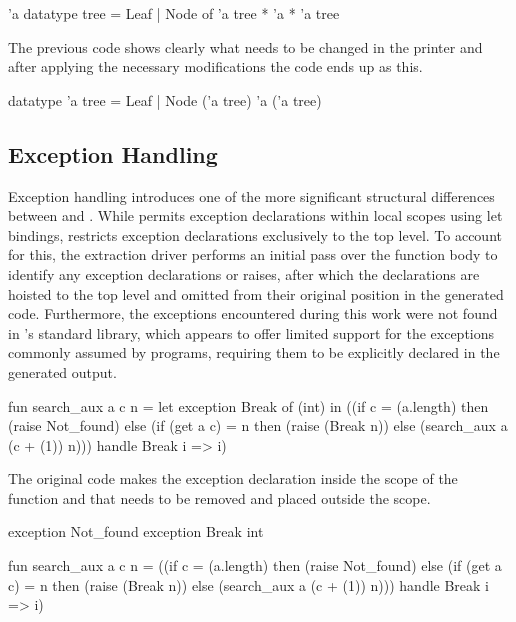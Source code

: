 \begin{cakeml}
    'a datatype tree = Leaf | Node of 'a tree * 'a * 'a tree
\end{cakeml}

The previous code shows clearly what needs to be changed in the printer and after applying the necessary modifications the code ends up as this.

\begin{cakeml}
    datatype 'a tree = Leaf | Node ('a tree) 'a ('a tree)
\end{cakeml}


\subsection{Exception Handling}

Exception handling introduces one of the more significant structural differences between \whyml and \cml. While \whyml permits exception declarations within local scopes 
using let bindings, \cml restricts exception declarations exclusively to the top level. To account for this, the extraction driver performs an initial pass over the function 
body to identify any exception declarations or raises, after which the declarations are hoisted to the top level and omitted from their original position in the generated code. 
Furthermore, the exceptions encountered during this work were not found in \cml's standard library, which appears to offer limited support for the exceptions commonly assumed 
by \whyml programs, requiring them to be explicitly declared in the generated output.

\begin{cakeml}
    fun search_aux a c n = 
    let exception Break of (int) in
    ((if c = (a.length) then (raise Not_found) 
        else (if (get a c) = n then (raise (Break n)) 
            else (search_aux a (c + (1)) n)))
    handle   Break i => i)
\end{cakeml}

The original code makes the exception declaration inside the scope of the function and that needs to be removed and placed outside the scope.

\begin{cakeml}
    exception Not_found
    exception Break int

    fun search_aux a c n = 
    ((if c = (a.length) then (raise Not_found) 
        else (if (get a c) = n then (raise (Break n)) 
            else (search_aux a (c + (1)) n)))
    handle   Break i => i)
\end{cakeml}

